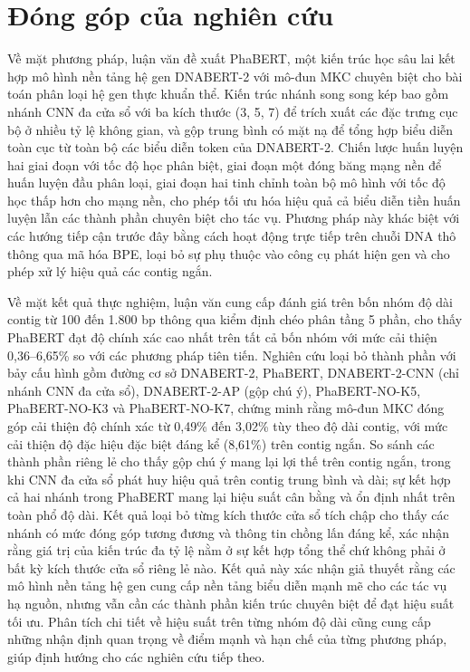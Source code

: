 \section{Đóng góp của nghiên cứu}
\label{sec:contributions_c5}

Về mặt phương pháp, luận văn đề xuất PhaBERT, một kiến trúc học sâu lai kết hợp mô hình nền tảng hệ gen DNABERT-2 với mô-đun MKC chuyên biệt cho bài toán phân loại hệ gen thực khuẩn thể. Kiến trúc nhánh song song kép bao gồm nhánh CNN đa cửa sổ với ba kích thước (3, 5, 7) để trích xuất các đặc trưng cục bộ ở nhiều tỷ lệ không gian, và gộp trung bình có mặt nạ để tổng hợp biểu diễn toàn cục từ toàn bộ các biểu diễn token của DNABERT-2. Chiến lược huấn luyện hai giai đoạn với tốc độ học phân biệt, giai đoạn một đóng băng mạng nền để huấn luyện đầu phân loại, giai đoạn hai tinh chỉnh toàn bộ mô hình với tốc độ học thấp hơn cho mạng nền, cho phép tối ưu hóa hiệu quả cả biểu diễn tiền huấn luyện lẫn các thành phần chuyên biệt cho tác vụ. Phương pháp này khác biệt với các hướng tiếp cận trước đây bằng cách hoạt động trực tiếp trên chuỗi DNA thô thông qua mã hóa BPE, loại bỏ sự phụ thuộc vào công cụ phát hiện gen và cho phép xử lý hiệu quả các contig ngắn.

Về mặt kết quả thực nghiệm, luận văn cung cấp đánh giá trên bốn nhóm độ dài contig từ 100 đến 1.800 bp thông qua kiểm định chéo phân tầng 5 phần, cho thấy PhaBERT đạt độ chính xác cao nhất trên tất cả bốn nhóm với mức cải thiện 0,36--6,65\% so với các phương pháp tiên tiến. Nghiên cứu loại bỏ thành phần với bảy cấu hình gồm đường cơ sở DNABERT-2, PhaBERT, DNABERT-2-CNN (chỉ nhánh CNN đa cửa sổ), DNABERT-2-AP (gộp chú ý), PhaBERT-NO-K5, PhaBERT-NO-K3 và PhaBERT-NO-K7, chứng minh rằng mô-đun MKC đóng góp cải thiện độ chính xác từ 0,49\% đến 3,02\% tùy theo độ dài contig, với mức cải thiện độ đặc hiệu đặc biệt đáng kể (8,61\%) trên contig ngắn. So sánh các thành phần riêng lẻ cho thấy gộp chú ý mang lại lợi thế trên contig ngắn, trong khi CNN đa cửa sổ phát huy hiệu quả trên contig trung bình và dài; sự kết hợp cả hai nhánh trong PhaBERT mang lại hiệu suất cân bằng và ổn định nhất trên toàn phổ độ dài. Kết quả loại bỏ từng kích thước cửa sổ tích chập cho thấy các nhánh có mức đóng góp tương đương và thông tin chồng lấn đáng kể, xác nhận rằng giá trị của kiến trúc đa tỷ lệ nằm ở sự kết hợp tổng thể chứ không phải ở bất kỳ kích thước cửa sổ riêng lẻ nào. Kết quả này xác nhận giả thuyết rằng các mô hình nền tảng hệ gen cung cấp nền tảng biểu diễn mạnh mẽ cho các tác vụ hạ nguồn, nhưng vẫn cần các thành phần kiến trúc chuyên biệt để đạt hiệu suất tối ưu. Phân tích chi tiết về hiệu suất trên từng nhóm độ dài cũng cung cấp những nhận định quan trọng về điểm mạnh và hạn chế của từng phương pháp, giúp định hướng cho các nghiên cứu tiếp theo.

